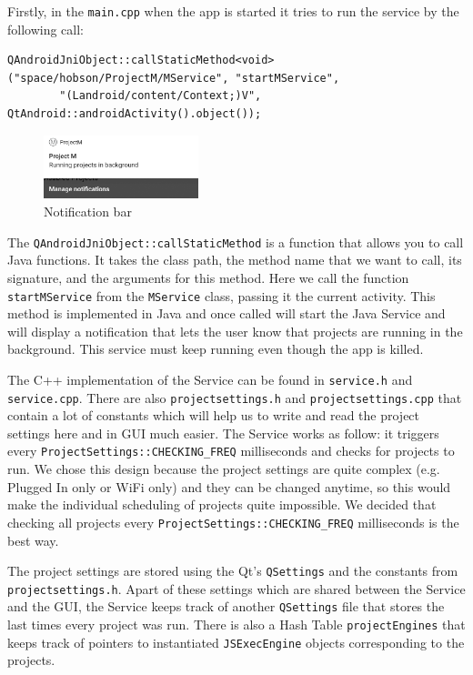 \documentclass{article}
\begin{document}
Firstly, in the \texttt{main.cpp} when the app is started it tries to run the service by the following call:
\begin{verbatim}
QAndroidJniObject::callStaticMethod<void>("space/hobson/ProjectM/MService", "startMService",
        "(Landroid/content/Context;)V", QtAndroid::androidActivity().object());
\end{verbatim}

\begin{figure}
  \centering
  \includegraphics[width=0.4\textwidth]{DocFiles/notification.png}
  \caption{Notification bar}
\end{figure}

The \texttt{QAndroidJniObject::callStaticMethod} is a function that allows you to call Java functions. It takes the class path, the method name that we want to call, its signature, and the arguments for this method. Here we call the function \texttt{startMService} from the \texttt{MService} class, passing it the current activity. This method is implemented in Java and once called will start the Java Service and will display a notification that lets the user know that projects are running in the background. This service must keep running even though the app is killed.

The C++ implementation of the Service can be found in \texttt{service.h} and \texttt{service.cpp}. There are also \texttt{projectsettings.h} and \texttt{projectsettings.cpp} that contain a lot of constants which will help us to write and read the project settings here and in GUI much easier. The Service works as follow: it triggers every \texttt{ProjectSettings::CHECKING\_FREQ} milliseconds and checks for projects to run. We chose this design because the project settings are quite complex (e.g. Plugged In only or WiFi only) and they can be changed anytime, so this would make the individual scheduling of projects quite impossible. We decided that checking all projects every \texttt{ProjectSettings::CHECKING\_FREQ} milliseconds is the best way.

The project settings are stored using the Qt's \texttt{QSettings} and the constants from \texttt{projectsettings.h}. Apart of these settings which are shared between the Service and the GUI, the Service keeps track of another \texttt{QSettings} file that stores the last times every project was run. There is also a Hash Table \texttt{projectEngines} that keeps track of pointers to instantiated \texttt{JSExecEngine} objects corresponding to the projects.
\end{document}
